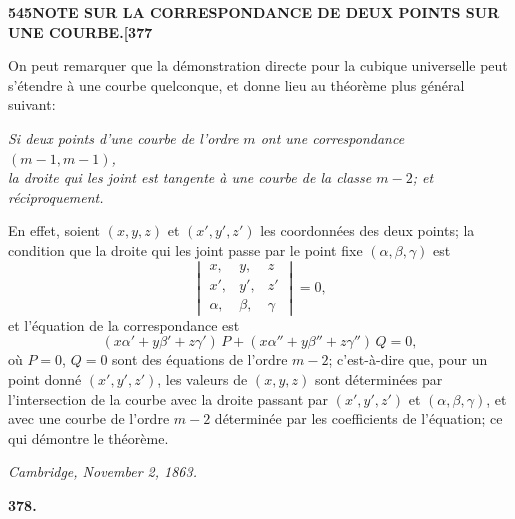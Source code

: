 \documentclass[11pt,a4paper]{article}
\begin{document}
\newpage
\noindent\textbf{545\hspace{1em}NOTE SUR LA CORRESPONDANCE DE DEUX POINTS SUR UNE COURBE.\hfill[377}

\vspace{12pt}

\noindent
On peut remarquer que la d\'{e}monstration directe pour la cubique universelle peut s'\'{e}tendre \`{a} une courbe quelconque, et donne lieu au th\'{e}or\`{e}me plus g\'{e}n\'{e}ral suivant:

\begin{center}
\textit{Si deux points d'une courbe de l'ordre $m$ ont une correspondance $(m - 1, m - 1)$,}\\
\textit{la droite qui les joint est tangente \`{a} une courbe de la classe $m - 2$; et}\\
\textit{r\'{e}ciproquement.}
\end{center}

En effet, soient $(x, y, z)$ et $(x', y', z')$ les coordonn\'{e}es des deux points; la condition que la droite qui les joint passe par le point fixe $(\alpha, \beta, \gamma)$ est
\[
\begin{vmatrix}
x, & y, & z \\
x', & y', & z' \\
\alpha, & \beta, & \gamma
\end{vmatrix}
= 0,
\]
et l'\'{e}quation de la correspondance est
\[
(x\alpha' + y\beta' + z\gamma')\,P + (x\alpha'' + y\beta'' + z\gamma'')\,Q = 0,
\]
o\`{u} $P = 0$, $Q = 0$ sont des \'{e}quations de l'ordre $m - 2$; c'est-\`{a}-dire que, pour un point donn\'{e} $(x', y', z')$, les valeurs de $(x, y, z)$ sont d\'{e}termin\'{e}es par l'intersection de la courbe avec la droite passant par $(x', y', z')$ et $(\alpha, \beta, \gamma)$, et avec une courbe de l'ordre $m - 2$ d\'{e}termin\'{e}e par les coefficients de l'\'{e}quation; ce qui d\'{e}montre le th\'{e}or\`{e}me.

\begin{flushright}
\textit{Cambridge, November 2, 1863.}
\end{flushright}

\vspace{24pt}


\newpage
\begin{center}
\textbf{378.}
\end{center}
\vspace{-8pt}
\end{document}
